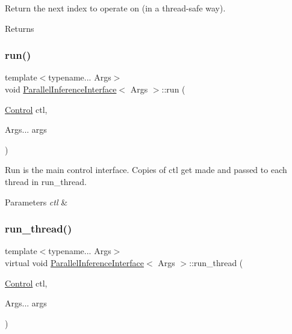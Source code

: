 Return the next index to operate on (in a thread-\/safe way). 

\begin{DoxyReturn}{Returns}

\end{DoxyReturn}
\mbox{\label{class_parallel_inference_interface_a836204d148b8b5187d39e494d926d7b3}} 
\subsubsection{\texorpdfstring{run()}{run()}}
{\footnotesize\ttfamily template$<$typename... Args$>$ \\
void \hyperlink{class_parallel_inference_interface}{Parallel\+Inference\+Interface}$<$ Args $>$\+::run (\begin{DoxyParamCaption}\item[{\hyperlink{struct_control}{Control}}]{ctl,  }\item[{Args...}]{args }\end{DoxyParamCaption})\hspace{0.3cm}{\ttfamily [inline]}}



Run is the main control interface. Copies of ctl get made and passed to each thread in run\+\_\+thread. 


\begin{DoxyParams}{Parameters}
{\em ctl} & \\
\hline
\end{DoxyParams}
\mbox{\label{class_parallel_inference_interface_a79f626a400fbc11ed530c97f32dfd5c3}} 
\subsubsection{\texorpdfstring{run\+\_\+thread()}{run\_thread()}}
{\footnotesize\ttfamily template$<$typename... Args$>$ \\
virtual void \hyperlink{class_parallel_inference_interface}{Parallel\+Inference\+Interface}$<$ Args $>$\+::run\+\_\+thread (\begin{DoxyParamCaption}\item[{\hyperlink{struct_control}{Control}}]{ctl,  }\item[{Args...}]{args }\end{DoxyParamCaption})\hspace{0.3cm}{\ttfamily [pure virtual]}}



